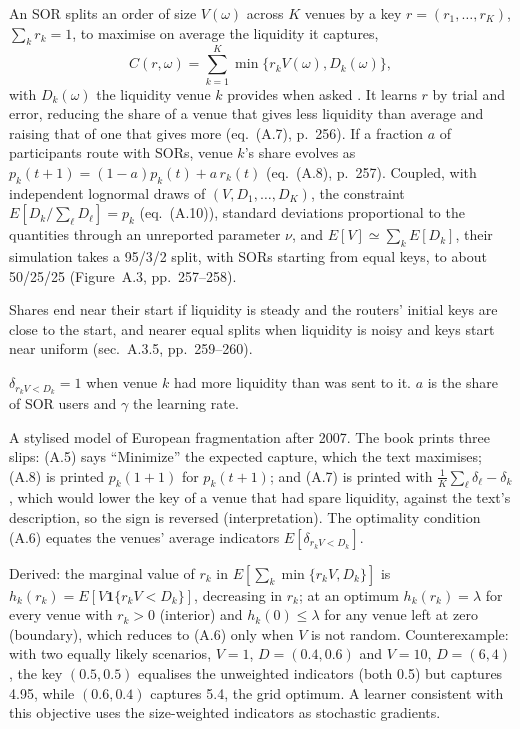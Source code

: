 \begin{qfmodel}\label{mod:sor-market-share-dynamics}
 An SOR splits an order of size $V(\omega)$ across $K$ venues by a key $r=(r_1,\dots,r_K)$, $\sum_kr_k=1$, to maximise on average the liquidity it captures,
\[ C(r,\omega)=\sum_{k=1}^K\min\{r_kV(\omega),D_k(\omega)\}, \]
with $D_k(\omega)$ the liquidity venue $k$ provides when asked \citep[app.~A, sec.~A.3.1, eq.~(A.5), p.~255]{alpha-laruelle}. It learns $r$ by trial and error, reducing the share of a venue that gives less liquidity than average and raising that of one that gives more (eq.~(A.7), p.~256). If a fraction $a$ of participants route with SORs, venue $k$'s share evolves as $p_k(t+1)=(1-a)p_k(t)+a\,r_k(t)$ (eq.~(A.8), p.~257). Coupled, with independent lognormal draws of $(V,D_1,\dots,D_K)$, the constraint $E[D_k/\sum_\ell D_\ell]=p_k$ (eq.~(A.10)), standard deviations proportional to the quantities through an unreported parameter $\nu$, and $E[V]\simeq\sum_kE[D_k]$, their simulation takes a 95/3/2 split, with SORs starting from equal keys, to about 50/25/25 (Figure~A.3, pp.~257--258).

Shares end near their start if liquidity is steady and the routers' initial keys are close to the start, and nearer equal splits when liquidity is noisy and keys start near uniform (sec.~A.3.5, pp.~259--260).

 $\delta_{r_kV<D_k}=1$ when venue $k$ had more liquidity than was sent to it. $a$ is the share of SOR users and $\gamma$ the learning rate.

 A stylised model of European fragmentation after 2007. The book prints three slips: (A.5) says ``Minimize'' the expected capture, which the text maximises; (A.8) is printed $p_k(1+1)$ for $p_k(t+1)$; and (A.7) is printed with $\tfrac1K\sum_\ell\delta_\ell-\delta_k$, which would lower the key of a venue that had spare liquidity, against the text's description, so the sign is reversed (interpretation). The optimality condition (A.6) equates the venues' average indicators $E[\delta_{r_kV<D_k}]$.

Derived: the marginal value of $r_k$ in $E[\sum_k\min\{r_kV,D_k\}]$ is $h_k(r_k)=E[V\mathbf 1\{r_kV<D_k\}]$, decreasing in $r_k$; at an optimum $h_k(r_k)=\lambda$ for every venue with $r_k>0$ (interior) and $h_k(0)\le\lambda$ for any venue left at zero (boundary), which reduces to (A.6) only when $V$ is not random. Counterexample: with two equally likely scenarios, $V=1$, $D=(0.4,0.6)$ and $V=10$, $D=(6,4)$, the key $(0.5,0.5)$ equalises the unweighted indicators (both 0.5) but captures 4.95, while $(0.6,0.4)$ captures 5.4, the grid optimum. A learner consistent with this objective uses the size-weighted indicators as stochastic gradients.


\end{qfmodel}

